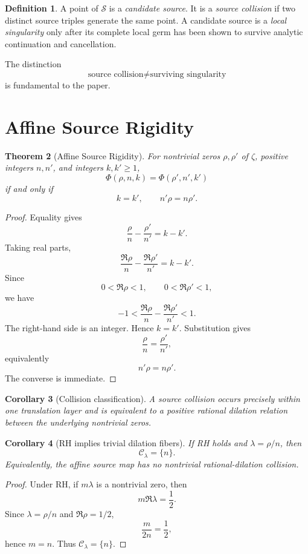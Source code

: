 \documentclass[11pt]{article}
\newtheorem{theorem}{Theorem}[section]
\newtheorem{corollary}[theorem]{Corollary}
\theoremstyle{definition}
\newtheorem{definition}[theorem]{Definition}
\newcommand{\C}{\mathcal C}
\newcommand{\PhiA}{\Phi}
\begin{document}
\begin{definition}
A point of $\mathscr S$ is a \emph{candidate source}. It is a \emph{source collision} if two distinct source triples generate the same point. A candidate source is a \emph{local singularity} only after its complete local germ has been shown to survive analytic continuation and cancellation.
\end{definition}

The distinction
\[
\boxed{\text{source collision}\neq\text{surviving singularity}}
\]
is fundamental to the paper.

\section{Affine Source Rigidity}

\begin{theorem}[Affine Source Rigidity]
\label{thm:rigidity}
For nontrivial zeros $\rho,\rho'$ of $\zeta$, positive integers $n,n'$, and integers $k,k'\ge1$,
\[
\PhiA(\rho,n,k)=\PhiA(\rho',n',k')
\]
if and only if
\[
k=k',\qquad n'\rho=n\rho'.
\]
\end{theorem}

\begin{proof}
Equality gives
\[
\frac{\rho}{n}-\frac{\rho'}{n'}=k-k'.
\]
Taking real parts,
\[
\frac{\Re\rho}{n}-\frac{\Re\rho'}{n'}=k-k'.
\]
Since
\[
0<\Re\rho<1,\qquad 0<\Re\rho'<1,
\]
we have
\[
-1<
\frac{\Re\rho}{n}-\frac{\Re\rho'}{n'}
<1.
\]
The right-hand side is an integer. Hence $k=k'$. Substitution gives
\[
\frac{\rho}{n}=\frac{\rho'}{n'},
\]
equivalently
\[
n'\rho=n\rho'.
\]
The converse is immediate.
\end{proof}

\begin{corollary}[Collision classification]
\label{cor:collision}
A source collision occurs precisely within one translation layer and is equivalent to a positive rational dilation relation between the underlying nontrivial zeros.
\end{corollary}

\begin{corollary}[RH implies trivial dilation fibers]
\label{cor:rh}
If RH holds and $\lambda=\rho/n$, then
\[
\C_\lambda=\{n\}.
\]
Equivalently, the affine source map has no nontrivial rational-dilation collision.
\end{corollary}

\begin{proof}
Under RH, if $m\lambda$ is a nontrivial zero, then
\[
m\Re\lambda=\frac12.
\]
Since $\lambda=\rho/n$ and $\Re\rho=1/2$,
\[
\frac{m}{2n}=\frac12,
\]
hence $m=n$. Thus $\C_\lambda=\{n\}$.
\end{proof}
\end{document}
